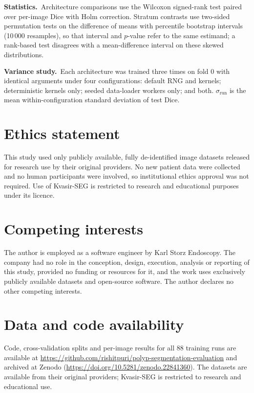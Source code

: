 \documentclass[journal]{IEEEtran}
\begin{document}
\smallskip\noindent\textbf{Statistics.}\  Architecture comparisons use the Wilcoxon signed-rank
test paired over per-image Dice with Holm correction. Stratum contrasts use
two-sided permutation tests on the difference of means with percentile
bootstrap intervals (10\,000 resamples), so that interval and $p$-value refer
to the same estimand; a rank-based test disagrees with a mean-difference
interval on these skewed distributions.

\smallskip\noindent\textbf{Variance study.}\  Each architecture was trained three times on fold
0 with identical arguments under four configurations: default RNG and
kernels; deterministic kernels only; seeded data-loader workers only; and
both. $\sigma_{\mathrm{run}}$ is the mean within-configuration standard
deviation of test Dice.

\section*{Ethics statement}

This study used only publicly available, fully de-identified image datasets
released for research use by their original providers. No new patient data
were collected and no human participants were involved, so institutional
ethics approval was not required. Use of Kvasir-SEG is restricted to research
and educational purposes under its licence.

\section*{Competing interests}

The author is employed as a software engineer by Karl Storz Endoscopy. The
company had no role in the conception, design, execution, analysis or
reporting of this study, provided no funding or resources for it, and the
work uses exclusively publicly available datasets and open-source software.
The author declares no other competing interests.

\section*{Data and code availability}

Code, cross-validation splits and per-image results for all 88 training runs
are available at
\url{https://github.com/rishitpuri/polyp-segmentation-evaluation} and archived at Zenodo
(\url{https://doi.org/10.5281/zenodo.22841360}). The datasets are available
from their original providers; Kvasir-SEG is restricted to research and
educational use.
\end{document}
